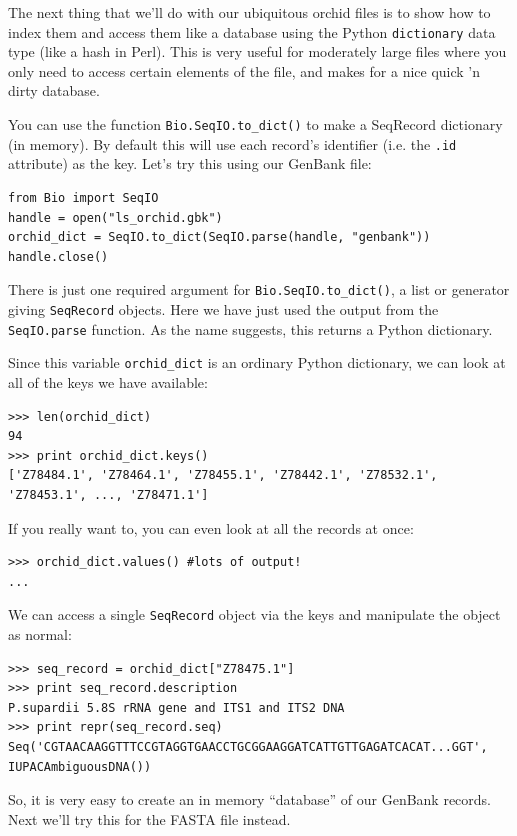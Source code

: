 \documentclass{report}
\begin{document}
The next thing that we'll do with our ubiquitous orchid files is to show how to index them and access them like a database using the Python \verb|dictionary| data type (like a hash in Perl). This is very useful for moderately large files where you only need to access certain elements of the file, and makes for a nice quick 'n dirty database.

You can use the function \verb|Bio.SeqIO.to_dict()| to make a SeqRecord dictionary (in memory).  By default this will use each record's identifier (i.e. the \verb|.id| attribute) as the key.  Let's try this using our GenBank file:

\begin{verbatim}
from Bio import SeqIO
handle = open("ls_orchid.gbk")
orchid_dict = SeqIO.to_dict(SeqIO.parse(handle, "genbank"))
handle.close()
\end{verbatim}

There is just one required argument for \verb|Bio.SeqIO.to_dict()|, a list or
generator giving \verb|SeqRecord| objects. Here we have just used the output
from the \verb|SeqIO.parse| function. As the name suggests, this returns a
Python dictionary.

Since this variable \verb|orchid_dict| is an ordinary Python dictionary, we can look at all of the keys we have available:

\begin{verbatim}
>>> len(orchid_dict)
94
>>> print orchid_dict.keys()
['Z78484.1', 'Z78464.1', 'Z78455.1', 'Z78442.1', 'Z78532.1', 'Z78453.1', ..., 'Z78471.1']
\end{verbatim}

If you really want to, you can even look at all the records at once:
\begin{verbatim}
>>> orchid_dict.values() #lots of output!
...
\end{verbatim}

We can access a single \verb|SeqRecord| object via the keys and manipulate the object as normal:

\begin{verbatim}
>>> seq_record = orchid_dict["Z78475.1"]
>>> print seq_record.description
P.supardii 5.8S rRNA gene and ITS1 and ITS2 DNA
>>> print repr(seq_record.seq)
Seq('CGTAACAAGGTTTCCGTAGGTGAACCTGCGGAAGGATCATTGTTGAGATCACAT...GGT', IUPACAmbiguousDNA())
\end{verbatim}

So, it is very easy to create an in memory ``database'' of our GenBank records.  Next we'll try this for the FASTA file instead.
\end{document}
